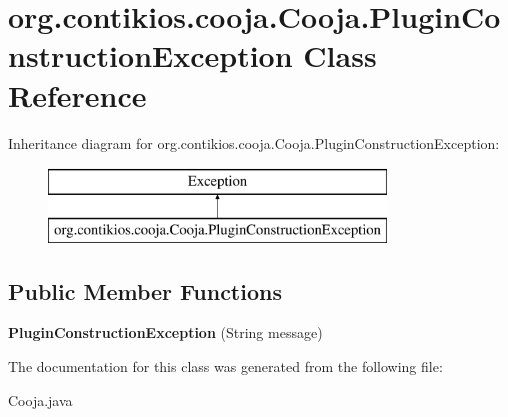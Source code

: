 \hypertarget{classorg_1_1contikios_1_1cooja_1_1Cooja_1_1PluginConstructionException}{\section{org.\-contikios.\-cooja.\-Cooja.\-Plugin\-Construction\-Exception Class Reference}
\label{classorg_1_1contikios_1_1cooja_1_1Cooja_1_1PluginConstructionException}
}
Inheritance diagram for org.\-contikios.\-cooja.\-Cooja.\-Plugin\-Construction\-Exception\-:\begin{figure}[H]
\begin{center}
\leavevmode
\includegraphics[height=2.000000cm]{classorg_1_1contikios_1_1cooja_1_1Cooja_1_1PluginConstructionException}
\end{center}
\end{figure}
\subsection*{Public Member Functions}
\begin{DoxyCompactItemize}
\item 
\hypertarget{classorg_1_1contikios_1_1cooja_1_1Cooja_1_1PluginConstructionException_afd8565dd04b259544a0ae5b496aacfee}{{\bfseries Plugin\-Construction\-Exception} (String message)}\label{classorg_1_1contikios_1_1cooja_1_1Cooja_1_1PluginConstructionException_afd8565dd04b259544a0ae5b496aacfee}

\end{DoxyCompactItemize}


The documentation for this class was generated from the following file\-:\begin{DoxyCompactItemize}
\item 
Cooja.\-java\end{DoxyCompactItemize}
